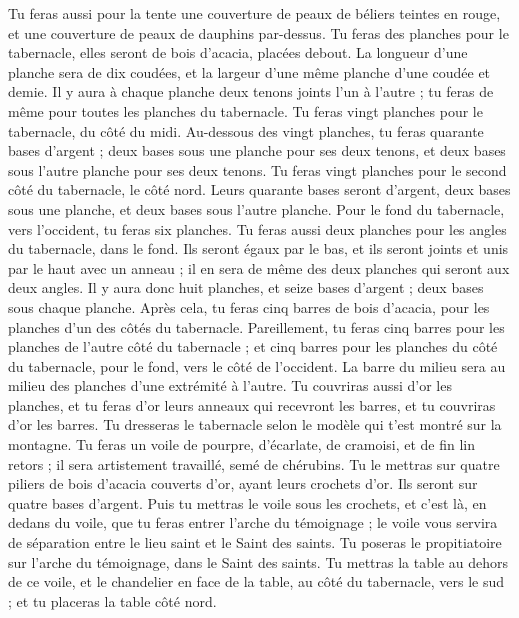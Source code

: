 \begin{multicols}{2}
Tu feras aussi pour la tente une couverture de peaux de béliers teintes en rouge, et une couverture de peaux de dauphins par-dessus\FTNT{}.
Tu feras des planches pour le tabernacle, elles seront de bois d’acacia, placées debout\FTNT{}.
La longueur d'une planche sera de dix coudées, et la largeur d’une même planche d'une coudée et demie.
Il y aura à chaque planche deux tenons joints l’un à l’autre ; tu feras de même pour toutes les planches du tabernacle.
Tu feras vingt planches pour le tabernacle, du côté du midi.
Au-dessous des vingt planches, tu feras quarante bases d'argent ; deux bases sous une planche pour ses deux tenons, et deux bases sous l'autre planche pour ses deux tenons.
Tu feras vingt planches pour le second côté du tabernacle, le côté nord.
Leurs quarante bases seront d'argent, deux bases sous une planche, et deux bases sous l'autre planche.
Pour le fond du tabernacle, vers l'occident, tu feras six planches.
Tu feras aussi deux planches pour les angles du tabernacle, dans le fond.
Ils seront égaux par le bas, et ils seront joints et unis par le haut avec un anneau ; il en sera de même des deux planches qui seront aux deux angles.
Il y aura donc huit planches, et seize bases d'argent ; deux bases sous chaque planche.
Après cela, tu feras cinq barres de bois d’acacia, pour les planches d'un des côtés du tabernacle.
Pareillement, tu feras cinq barres pour les planches de l'autre côté du tabernacle ; et cinq barres pour les planches du côté du tabernacle, pour le fond, vers le côté de l'occident.
La barre du milieu sera au milieu des planches d’une extrémité à l’autre.
Tu couvriras aussi d'or les planches, et tu feras d'or leurs anneaux qui recevront les barres, et tu couvriras d'or les barres.
Tu dresseras le tabernacle selon le modèle qui t’est montré sur la montagne.
Tu feras un voile\FTNT{} de pourpre, d'écarlate, de cramoisi, et de fin lin retors ; il sera artistement travaillé, semé de chérubins.
Tu le mettras sur quatre piliers de bois d’acacia couverts d'or, ayant leurs crochets d'or. Ils seront sur quatre bases d'argent.
Puis tu mettras le voile sous les crochets, et c’est là, en dedans du voile, que tu feras entrer l'arche du témoignage ; le voile vous servira de séparation entre le lieu saint et le Saint des saints.
Tu poseras le propitiatoire sur l'arche du témoignage, dans le Saint des saints.
Tu mettras la table au dehors de ce voile, et le chandelier en face de la table, au côté du tabernacle, vers le sud ; et tu placeras la table côté nord.

\end{multicols}
